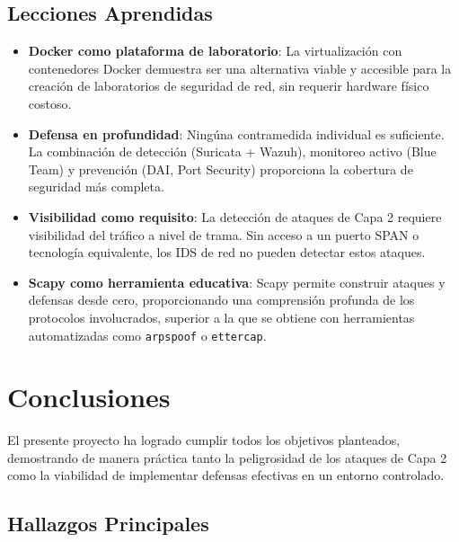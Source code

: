 \documentclass[12pt, a4paper]{article}
\begin{document}
\subsection{Lecciones Aprendidas}

\begin{itemize}[leftmargin=2cm]
    \item \textbf{Docker como plataforma de laboratorio}: La virtualizaci\'on con contenedores Docker demuestra ser una alternativa viable y accesible para la creaci\'on de laboratorios de seguridad de red, sin requerir hardware f\'isico costoso.

    \item \textbf{Defensa en profundidad}: Ning\'una contramedida individual es suficiente. La combinaci\'on de detecci\'on (Suricata + Wazuh), monitoreo activo (Blue Team) y prevenci\'on (DAI, Port Security) proporciona la cobertura de seguridad m\'as completa.

    \item \textbf{Visibilidad como requisito}: La detecci\'on de ataques de Capa 2 requiere visibilidad del tr\'afico a nivel de trama. Sin acceso a un puerto SPAN o tecnolog\'ia equivalente, los IDS de red no pueden detectar estos ataques.

    \item \textbf{Scapy como herramienta educativa}: Scapy permite construir ataques y defensas desde cero, proporcionando una comprensi\'on profunda de los protocolos involucrados, superior a la que se obtiene con herramientas automatizadas como \texttt{arpspoof} o \texttt{ettercap}.
\end{itemize}

\newpage

\section{Conclusiones}

El presente proyecto ha logrado cumplir todos los objetivos planteados, demostrando de manera pr\'actica tanto la peligrosidad de los ataques de Capa 2 como la viabilidad de implementar defensas efectivas en un entorno controlado.

\subsection{Hallazgos Principales}
\end{document}
